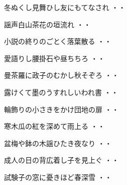\vspace{0.6cm}
\begin{shiika}冬ぬくし見舞ひし友にもてなされ
\hfill{・・}\end{shiika}
\vspace{0.6cm}
\begin{shiika}謡声白山茶花の垣流れ
\hfill{・・}\end{shiika}
\vspace{0.6cm}
\begin{shiika}小説の終りのごとく落葉散る
\hfill{・・}\end{shiika}
\vspace{0.6cm}
\begin{shiika}愛語りし腰掛石や昼ちちろ
\hfill{・・}\end{shiika}
\vspace{0.6cm}
\begin{shiika}曼茶羅に政子のむかし秋そぞろ
\hfill{・・}\end{shiika}
\vspace{0.6cm}
\begin{shiika}露けくて墨のうすれしいわれ書
\hfill{・・}\end{shiika}
\vspace{0.6cm}
\begin{shiika}輪飾りの小さきをかけ団地の扉
\hfill{・・}\end{shiika}
\vspace{0.6cm}
\begin{shiika}寒木瓜の紅を深めて雨上る
\hfill{・・}\end{shiika}
\vspace{0.6cm}
\begin{shiika}盆梅や鉢の木謡ひたき夜なり
\hfill{・・}\end{shiika}
\vspace{0.6cm}
\begin{shiika}成人の日の背広着し子を見上ぐ
\hfill{・・}\end{shiika}
\vspace{0.6cm}
\begin{shiika}試験子の窓に憂きほど春深雪
\hfill{・・}\end{shiika}

